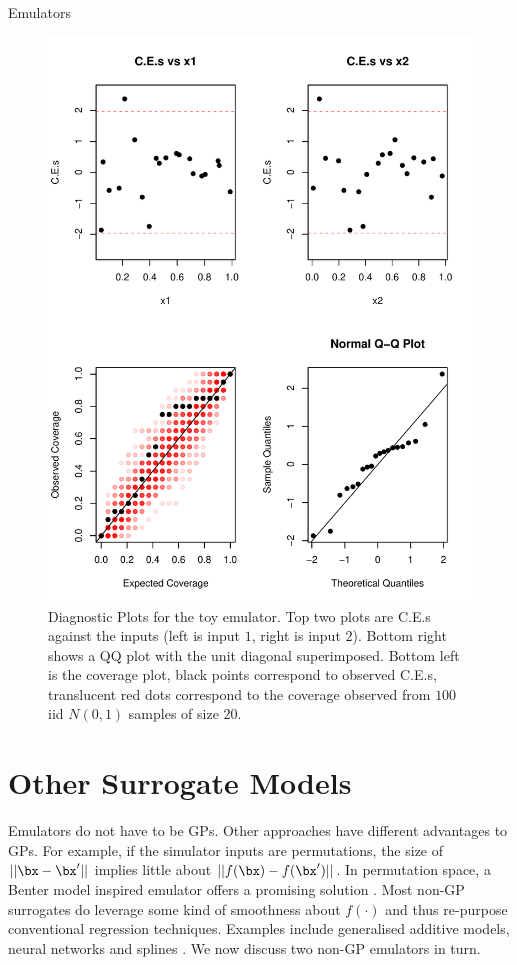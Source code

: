\begin{chapter}{Emulators \label{Ch:Emulators}}
\begin{figure}[H]
  \centering
  \includegraphics{fig-emulators/diag2.pdf}
  \caption{Diagnostic Plots for the toy emulator. Top two plots are C.E.s against the inputs (left is input $1$, right is input $2$). Bottom right shows a QQ plot with the unit diagonal superimposed. Bottom left is the coverage plot, black points correspond to observed C.E.s, translucent red dots correspond to the coverage observed from $100$ iid $N(0,1)$ samples of size $20$.}
  \label{Fig:diag2}
\end{figure}
\section{Other Surrogate Models}
Emulators do not have to be GPs. Other approaches have different advantages to GPs. For example, if the simulator inputs are permutations, the size of $||\bx - \bx'||$ implies little about $||f(\bx) - f(\bx')||$. In permutation space, a Benter model inspired emulator offers a promising solution \citep{Wilson2018}. Most non-GP surrogates do leverage some kind of smoothness about $f(\cdot)$ and thus re-purpose conventional regression techniques. Examples include generalised additive models, neural networks and splines \citep{Marrel2012, Tripathy2018, Barton2006}. We now discuss two non-GP emulators in turn.

\end{chapter}
